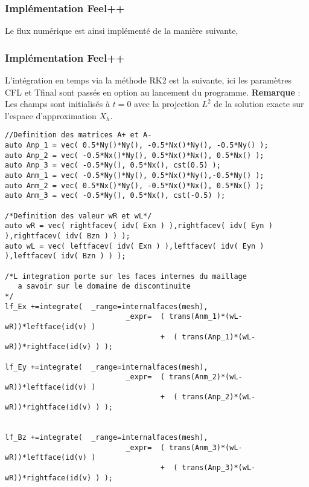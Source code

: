 \documentclass[a4paper,oneside,10pt]{report}
\begin{document}
\subsubsection{Implémentation \textbf{Feel++}}

Le flux numérique est ainsi implémenté de la manière suivante,

\subsubsection{Implémentation \textbf{Feel++}}
L'intégration en temps via la méthode RK2 est la suivante, ici les paramètres CFL et Tfinal sont passés en option au lancement du programme.
\textbf{Remarque} : Les champs sont initialisés à $t=0$ avec la projection $L^2$ de la solution exacte sur l'espace d'approximation $X_h$.
\begin{center}
\begin{minipage}{\textwidth}
\begin{lstlisting}[label=code2,caption=calcul du flux numerique decentre: assemble\_RHS()]
//Definition des matrices A+ et A-
auto Anp_1 = vec( 0.5*Ny()*Ny(), -0.5*Nx()*Ny(), -0.5*Ny() );
auto Anp_2 = vec( -0.5*Nx()*Ny(), 0.5*Nx()*Nx(), 0.5*Nx() );
auto Anp_3 = vec( -0.5*Ny(), 0.5*Nx(), cst(0.5) );
auto Anm_1 = vec( -0.5*Ny()*Ny(), 0.5*Nx()*Ny(),-0.5*Ny() );
auto Anm_2 = vec( 0.5*Nx()*Ny(), -0.5*Nx()*Nx(), 0.5*Nx() );
auto Anm_3 = vec( -0.5*Ny(), 0.5*Nx(), cst(-0.5) );

/*Definition des valeur wR et wL*/
auto wR = vec( rightfacev( idv( Exn ) ),rightfacev( idv( Eyn ) ),rightfacev( idv( Bzn ) ) );
auto wL = vec( leftfacev( idv( Exn ) ),leftfacev( idv( Eyn ) ),leftfacev( idv( Bzn ) ) );

/*L integration porte sur les faces internes du maillage 
   a savoir sur le domaine de discontinuite 
*/
lf_Ex +=integrate(	_range=internalfaces(mesh),
							_expr=	( trans(Anm_1)*(wL-wR))*leftface(id(v) )
									+  ( trans(Anp_1)*(wL-wR))*rightface(id(v) ) );
	
lf_Ey +=integrate(	_range=internalfaces(mesh),
							_expr=	( trans(Anm_2)*(wL-wR))*leftface(id(v) )
									+  ( trans(Anp_2)*(wL-wR))*rightface(id(v) ) );
	
	
lf_Bz +=integrate(	_range=internalfaces(mesh),
							_expr=	( trans(Anm_3)*(wL-wR))*leftface(id(v) )
									+  ( trans(Anp_3)*(wL-wR))*rightface(id(v) ) );

\end{lstlisting}
\end{minipage}
\end{center}
\end{document}
